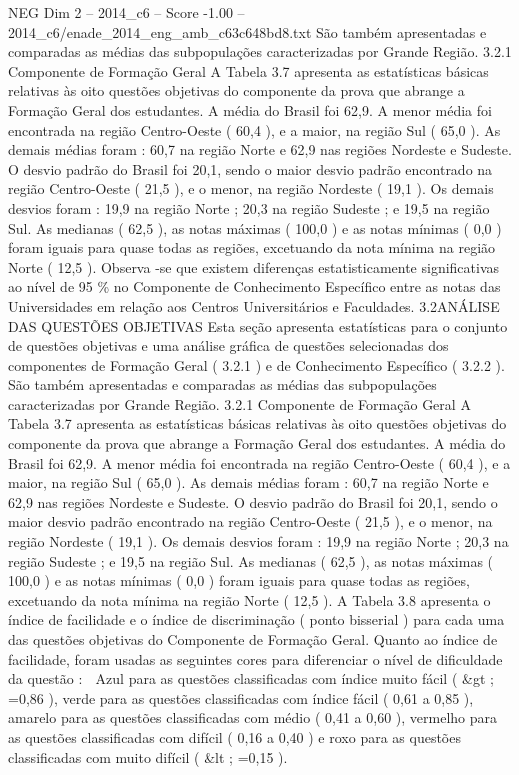 \begin{textsample}{NEG Dim 2 – 2014\_c6 – Score -1.00 – 2014\_c6/enade\_2014\_eng\_amb\_c63c648bd8.txt}
São também apresentadas e comparadas as médias das subpopulações caracterizadas por Grande Região. 3.2.1 Componente de Formação Geral A Tabela 3.7 apresenta as estatísticas básicas relativas às oito questões objetivas do componente da prova que abrange a Formação Geral dos estudantes.
A média do Brasil foi 62,9.
A menor média foi encontrada na região Centro-Oeste ( 60,4 ), e a maior, na região Sul ( 65,0 ).
As demais médias foram : 60,7 na região Norte e 62,9 nas regiões Nordeste e Sudeste.
O desvio padrão do Brasil foi 20,1, sendo o maior desvio padrão encontrado na região Centro-Oeste ( 21,5 ), e o menor, na região Nordeste ( 19,1 ).
Os demais desvios foram : 19,9 na região Norte ; 20,3 na região Sudeste ; e 19,5 na região Sul.
As medianas ( 62,5 ), as notas máximas ( 100,0 ) e as notas mínimas ( 0,0 ) foram iguais para quase todas as regiões, excetuando da nota mínima na região Norte ( 12,5 ).
Observa -se que existem diferenças estatisticamente significativas ao nível de 95 \% no Componente de Conhecimento Específico entre as notas das Universidades em relação aos Centros Universitários e Faculdades. 3.2ANÁLISE DAS QUESTÕES OBJETIVAS Esta seção apresenta estatísticas para o conjunto de questões objetivas e uma análise gráfica de questões selecionadas dos componentes de Formação Geral ( 3.2.1 ) e de Conhecimento Específico ( 3.2.2 ).
São também apresentadas e comparadas as médias das subpopulações caracterizadas por Grande Região. 3.2.1 Componente de Formação Geral A Tabela 3.7 apresenta as estatísticas básicas relativas às oito questões objetivas do componente da prova que abrange a Formação Geral dos estudantes.
A média do Brasil foi 62,9.
A menor média foi encontrada na região Centro-Oeste ( 60,4 ), e a maior, na região Sul ( 65,0 ).
As demais médias foram : 60,7 na região Norte e 62,9 nas regiões Nordeste e Sudeste.
O desvio padrão do Brasil foi 20,1, sendo o maior desvio padrão encontrado na região Centro-Oeste ( 21,5 ), e o menor, na região Nordeste ( 19,1 ).
Os demais desvios foram : 19,9 na região Norte ; 20,3 na região Sudeste ; e 19,5 na região Sul.
As medianas ( 62,5 ), as notas máximas ( 100,0 ) e as notas mínimas ( 0,0 ) foram iguais para quase todas as regiões, excetuando da nota mínima na região Norte ( 12,5 ).
A Tabela 3.8 apresenta o índice de facilidade e o índice de discriminação ( ponto bisserial ) para cada uma das questões objetivas do Componente de Formação Geral.
Quanto ao índice de facilidade, foram usadas as seguintes cores para diferenciar o nível de dificuldade da questão :  Azul para as questões classificadas com índice muito fácil ( \&gt ; =0,86 ), verde para as questões classificadas com índice fácil ( 0,61 a 0,85 ), amarelo para as questões classificadas com médio ( 0,41 a 0,60 ), vermelho para as questões classificadas com difícil ( 0,16 a 0,40 ) e roxo para as questões classificadas com muito difícil ( \&lt ; =0,15 ).

\end{textsample}
